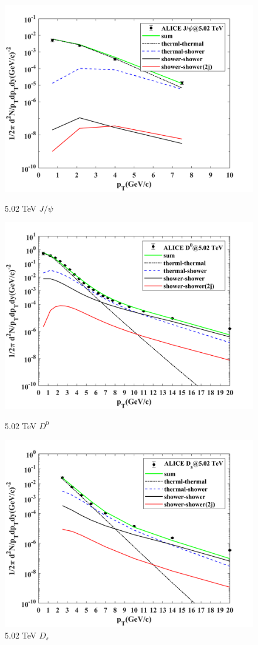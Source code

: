 \documentclass[onecolumn,aps,superscriptaddress,nofootinbib,floatfix]{revtex4}
\begin{document}
\begin{figure}[H]
	\qquad
	
	\begin{minipage}{0.3\linewidth}
		\centering
		\includegraphics[width=0.9\linewidth]{230704_Jpsi_502.png}
		\caption{5.02 TeV $J/\psi$}
	\end{minipage}
	\begin{minipage}{0.3\linewidth}
		\centering
		\includegraphics[width=0.9\linewidth]{230704_D0_502.png}
		\caption{5.02 TeV $D^0$}
	\end{minipage}
	\begin{minipage}{0.3\linewidth}
		\centering
		\includegraphics[width=0.9\linewidth]{230704_Ds_502.png}
		\caption{5.02 TeV $D_s$}
	\end{minipage}
	

\end{figure}
\end{document}
